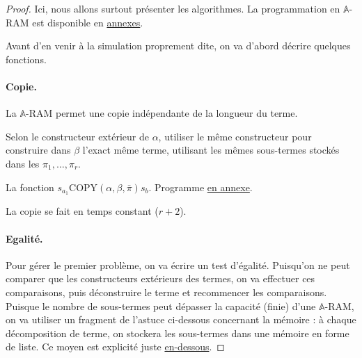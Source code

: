 \documentclass{report}
\newcommand{\bbA}{\mathbb{A}}
\begin{document}
				\begin{proof}
					Ici, nous allons surtout présenter les algorithmes. La programmation en $\bbA$-RAM est disponible en \hyperref[sec:annexes_programmes]{annexes}.
					
					Avant d'en venir à la simulation proprement dite, on va d'abord décrire quelques fonctions.
			
					
					\paragraph{Copie.}
					
					La $\bbA$-RAM permet une copie indépendante de la longueur du terme. 
					
					\espace 
					
					\begin{algorithm}[H]
						\label{algo:A_RAM_fn_COPY}
						
							
						Selon le constructeur extérieur de $\alpha$, utiliser le même constructeur pour construire dans $\beta$ l'exact même terme, utilisant les mêmes sous-termes stockés dans les $\pi_1, \dots, \pi_r$.
						
						\caption{La fonction $s_{a_1}\text{COPY}(\alpha, \beta, \bar{\pi}) s_b$. Programme \hyperref[prog:A_RAM_fn_COPY]{en annexe}.}
					\end{algorithm}
						
					\espace
					
					La copie se fait en temps constant ($r+2$).
					
	
					\paragraph{Egalité.}
					Pour gérer le premier problème, on va écrire un test d'égalité. Puisqu'on ne peut comparer que les constructeurs extérieurs des termes, on va effectuer ces comparaisons, puis déconstruire le terme et recommencer les comparaisons. Puisque le nombre de sous-termes peut dépasser la capacité (finie) d'une $\bbA$-RAM, on va utiliser un fragment de l'astuce ci-dessous concernant la mémoire : à chaque décomposition de terme, on stockera les sous-termes dans une mémoire en forme de liste. Ce moyen est explicité juste \hyperref[par:A_RAM_memoire]{en-dessous}.
	

\end{proof}
\end{document}
